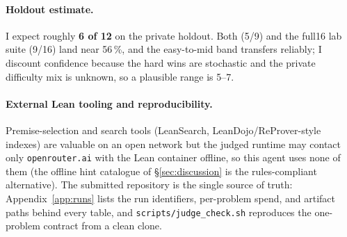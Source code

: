 \paragraph{Holdout estimate.} I expect roughly \textbf{6 of 12} on the private
holdout. Both \Sdev{} (5/9) and the full16 lab suite (9/16) land near 56\,\%, and
the easy-to-mid band transfers reliably; I discount confidence because the hard
wins are stochastic and the private difficulty mix is unknown, so a plausible
range is 5--7.

\paragraph{External Lean tooling and reproducibility.} Premise-selection and
search tools (LeanSearch, LeanDojo/ReProver-style indexes) are valuable on an open
network but the judged runtime may contact only \nolinkurl{openrouter.ai} with the
Lean container offline, so this agent uses none of them (the offline hint catalogue
of \S\ref{sec:discussion} is the rules-compliant alternative). The submitted
repository is the single source of truth: Appendix~\ref{app:runs} lists the run
identifiers, per-problem spend, and artifact paths behind every table, and
\texttt{scripts/judge\_check.sh} reproduces the one-problem contract from a clean
clone.
